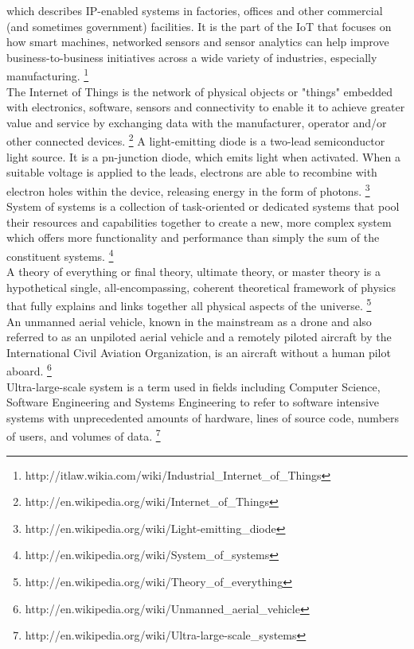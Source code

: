 \begin{acronym}
		which describes IP-enabled systems in factories, offices and other
		commercial (and sometimes government) facilities. It is the part of the
		\acs{IoT} that focuses on how smart machines, networked sensors and
		sensor analytics can help improve business-to-business initiatives
		across a wide variety of industries, especially manufacturing.
		\footnote{http://itlaw.wikia.com/wiki/Industrial\_Internet\_of\_Things}
	\\
		The Internet of Things is the network of physical objects or "things"
		embedded with electronics, software, sensors and connectivity to enable
		it to achieve greater value and service by exchanging data with the
		manufacturer, operator and/or other connected devices.
		\footnote{http://en.wikipedia.org/wiki/Internet\_of\_Things}
		A light-emitting diode is a two-lead semiconductor light source. It is
		a pn-junction diode, which emits light when activated. When a suitable
		voltage is applied to the leads, electrons are able to recombine with
		electron holes within the device, releasing energy in the form of
		photons.
		\footnote{http://en.wikipedia.org/wiki/Light-emitting\_diode}
	\\
		System of systems is a collection of task-oriented or dedicated systems
		that pool their resources and capabilities together to create a new,
		more complex system which offers more functionality and performance
		than simply the sum of the constituent systems.
		\footnote{http://en.wikipedia.org/wiki/System\_of\_systems}
	\\
		A theory of everything or final theory, ultimate theory, or master
		theory is a hypothetical single, all-encompassing, coherent theoretical
		framework of physics that fully explains and links together all
		physical aspects of the universe.
		\footnote{http://en.wikipedia.org/wiki/Theory\_of\_everything}
	\\
		An unmanned aerial vehicle, known in the mainstream as a drone and also
		referred to as an unpiloted aerial vehicle and a remotely piloted
		aircraft by the International Civil Aviation Organization, is an
		aircraft without a human pilot aboard.
		\footnote{http://en.wikipedia.org/wiki/Unmanned\_aerial\_vehicle}
	\\
		Ultra-large-scale system is a term used in fields including Computer
		Science, Software Engineering and Systems Engineering to refer to
		software intensive systems with unprecedented amounts of hardware,
		lines of source code, numbers of users, and volumes of data.
		\footnote{http://en.wikipedia.org/wiki/Ultra-large-scale\_systems}
\end{acronym}